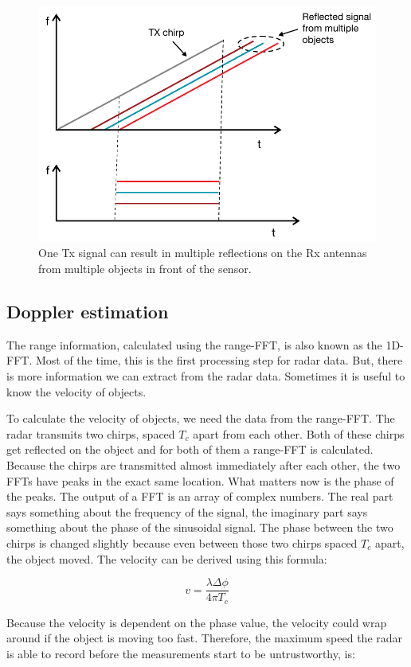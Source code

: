 \begin{figure}[t]
\centering
\includegraphics[width=.5\textwidth]{figures/reflected_signals.png}
\caption{One Tx signal can result in multiple reflections on the Rx antennas from multiple objects in front of the sensor.}
\label{fig:if_multiple}
\end{figure}

\subsection{Doppler estimation}
The range information, calculated using the range-FFT, is also known as the 1D-FFT. Most of the time, this is the first processing step for radar data. But, there is more information we can extract from the radar data. Sometimes it is useful to know the velocity of objects. 

To calculate the velocity of objects, we need the data from the range-FFT. The radar transmits two chirps, spaced $T_c$ apart from each other. Both of these chirps get reflected on the object and for both of them a range-FFT is calculated. Because the chirps are transmitted almost immediately after each other, the two FFTs have peaks in the exact same location. What matters now is the phase of the peaks. The output of a FFT is an array of complex numbers. The real part says something about the frequency of the signal, the imaginary part says something about the phase of the sinusoidal signal. The phase between the two chirps is changed slightly because even between those two chirps spaced $T_c$ apart, the object moved. The velocity can be derived using this formula:

\begin{equation}
v = \frac{\lambda \Delta \phi}{4 \pi T_c}
\label{eq:doppler_equation}
\end{equation}

Because the velocity is dependent on the phase value, the velocity could wrap around if the object is moving too fast. Therefore, the maximum speed the radar is able to record before the measurements start to be untrustworthy, is:

